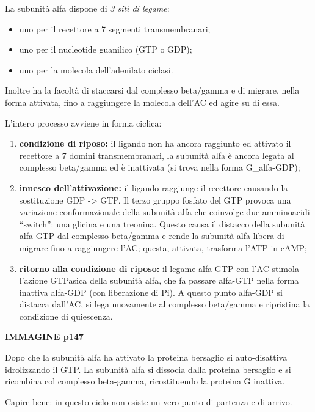 \documentclass[]{article}
\begin{document}
La subunità alfa dispone di \emph{3 siti di legame}:

\begin{itemize}
\itemsep1pt\parskip0pt
\item
  uno per il recettore a 7 segmenti transmembranari;
\item
  uno per il nucleotide guanilico (GTP o GDP);
\item
  uno per la molecola dell'adenilato ciclasi.
\end{itemize}

Inoltre ha la facoltà di staccarsi dal complesso beta/gamma e di
migrare, nella forma attivata, fino a raggiungere la molecola dell'AC ed
agire su di essa.

L'intero processo avviene in forma ciclica:

\begin{enumerate}
\def\labelenumi{\arabic{enumi}.}
\itemsep1pt\parskip0pt
\item
  \textbf{condizione di riposo:} il ligando non ha ancora raggiunto ed
  attivato il recettore a 7 domini transmembranari, la subunità alfa è
  ancora legata al complesso beta/gamma ed è inattivata (si trova nella
  forma G\_alfa-GDP);
\item
  \textbf{innesco dell'attivazione:} il ligando raggiunge il recettore
  causando la sostituzione GDP -\textgreater{} GTP. Il terzo gruppo
  fosfato del GTP provoca una variazione conformazionale della subunità
  alfa che coinvolge due amminoacidi ``switch'': una glicina e una
  treonina. Questo causa il distacco della subunità alfa-GTP dal
  complesso beta/gamma e rende la subunità alfa libera di migrare fino a
  raggiungere l'AC; questa, attivata, trasforma l'ATP in cAMP;
\item
  \textbf{ritorno alla condizione di riposo:} il legame alfa-GTP con
  l'AC stimola l'azione GTPasica della subunità alfa, che fa passare
  alfa-GTP nella forma inattiva alfa-GDP (con liberazione di Pi). A
  questo punto alfa-GDP si distacca dall'AC, si lega nuovamente al
  complesso beta/gamma e ripristina la condizione di quiescenza.
\end{enumerate}

\textbf{IMMAGINE p147}

Dopo che la subunità alfa ha attivato la proteina bersaglio si
auto-disattiva idrolizzando il GTP. La subunità alfa si dissocia dalla
proteina bersaglio e si ricombina col complesso beta-gamma,
ricostituendo la proteina G inattiva.

Capire bene: in questo ciclo non esiste un vero punto di partenza e di
arrivo.
\end{document}
